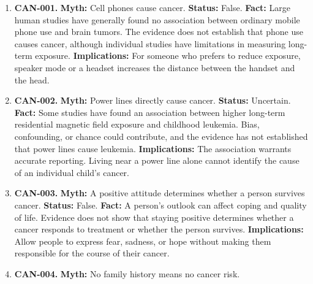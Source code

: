 \documentclass[11pt,oneside]{book}
\begin{document}
\begin{enumerate}[leftmargin=0pt,labelwidth=0pt,labelsep=0pt,itemindent=0pt]
The following entries address additional claims encountered in public-health discussions and reference collections. Their inclusion does not imply that every claim is equally prevalent or that a single source represents all communities; each claim should still be interpreted in its clinical and cultural context \cite{ref16,ref17,ref18,ref36,ref15,ref59,ref60,ref61}.
\item[] \textbf{CAN-001.} \textbf{Myth:} Cell phones cause cancer.\newline
\textbf{Status:} False.\newline
\textbf{Fact:} Large human studies have generally found no association between ordinary mobile phone use and brain tumors. The evidence does not establish that phone use causes cancer, although individual studies have limitations in measuring long-term exposure. \cite{ref379}\newline
\textbf{Implications:} For someone who prefers to reduce exposure, speaker mode or a headset increases the distance between the handset and the head.
\item[] \textbf{CAN-002.} \textbf{Myth:} Power lines directly cause cancer.\newline
\textbf{Status:} Uncertain.\newline
\textbf{Fact:} Some studies have found an association between higher long-term residential magnetic field exposure and childhood leukemia. Bias, confounding, or chance could contribute, and the evidence has not established that power lines cause leukemia. \cite{ref380}\newline
\textbf{Implications:} The association warrants accurate reporting. Living near a power line alone cannot identify the cause of an individual child's cancer.
\item[] \textbf{CAN-003.} \textbf{Myth:} A positive attitude determines whether a person survives cancer.\newline
\textbf{Status:} False.\newline
\textbf{Fact:} A person's outlook can affect coping and quality of life. Evidence does not show that staying positive determines whether a cancer responds to treatment or whether the person survives. \cite{ref16}\newline
\textbf{Implications:} Allow people to express fear, sadness, or hope without making them responsible for the course of their cancer.
\item[] \textbf{CAN-004.} \textbf{Myth:} No family history means no cancer risk.\newline

\end{enumerate}
\end{document}
